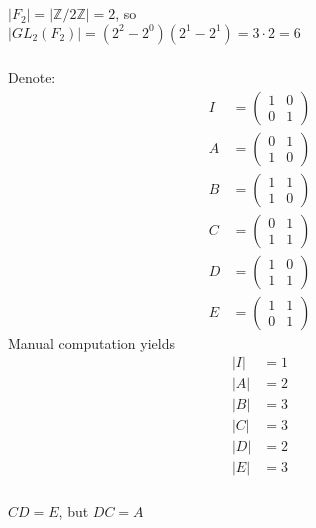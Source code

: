 \documentclass{article}
\newcommand{\ints}{\mathbb{Z}}
\begin{document}
\subsection{}\label{sec4}
\subsubsection{}\label{ex4p1}
$|F_2| = |\ints/2\ints| = 2$, so\\
$|GL_2(F_2)| = (2^2 - 2^0)(2^1 - 2^1) = 3\cdot 2 = 6$
\subsubsection{}\label{ex4p2}
Denote:
\begin{align*}
I &= 
\begin{pmatrix}
1 & 0\\
0 & 1
\end{pmatrix}\\
A &= 
\begin{pmatrix}
0 & 1\\
1 & 0
\end{pmatrix}\\
B &= 
\begin{pmatrix}
1 & 1\\
1 & 0
\end{pmatrix}\\
C &= 
\begin{pmatrix}
0 & 1\\
1 & 1
\end{pmatrix}\\
D &= 
\begin{pmatrix}
1 & 0\\
1 & 1
\end{pmatrix}\\
E &= 
\begin{pmatrix}
1 & 1\\
0 & 1
\end{pmatrix}
\end{align*}
Manual computation yields
\begin{align*}
|I| &= 1\\
|A| &= 2\\
|B| &= 3\\
|C| &= 3\\
|D| &= 2\\
|E| &= 3
\end{align*}
\subsubsection{}\label{ex4p3}
$CD = E$, but $DC = A$
\end{document}
